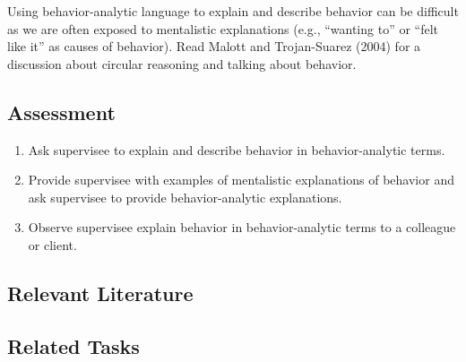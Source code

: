 Using behavior-analytic language to explain and describe behavior can be difficult as we are often exposed to mentalistic explanations (e.g., ``wanting to'' or ``felt like it'' as causes of behavior).  Read Malott and Trojan-Suarez (2004) for a discussion about circular reasoning and talking about behavior.

\subsection{Assessment}
\begin{enumerate}
\item Ask supervisee to explain and describe behavior in behavior-analytic terms.
\item Provide supervisee with examples of mentalistic explanations of behavior and ask supervisee to provide behavior-analytic explanations.
\item Observe supervisee explain behavior in behavior-analytic terms to a colleague or client.
%
\end{enumerate}
%
\subsection{Relevant Literature}
\begin{refsection}
\nocite{test,alang2017police,clayton2018black}
\printbibliography[heading=none]
\end{refsection}
%
\subsection{Related Tasks}
\fourFKSeven{}\\
\fourFKEight{}\\
\fourFKThirtyOne{}\\
\fourFKThirtyThree{}\\
\fourgFour{}\\
\fouriOne{}\\
\fouriTwo{}\\
%
%
%
%
%
%
\section[\fourgSix{}]{\fourgSix{}%
              }
